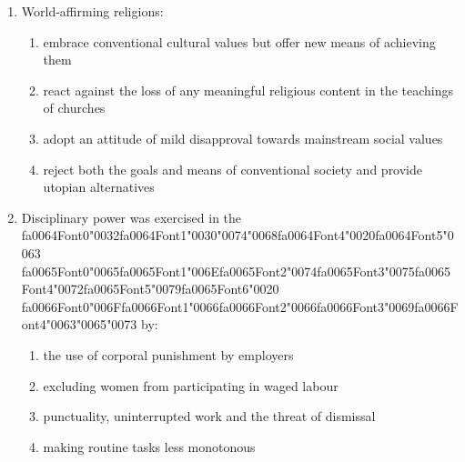 \documentclass[12pt]{article}
\begin{document}
\begin{enumerate}[label=\arabic*.]
\begin{enumerate}[label=(\alph*)]
    \item charismatic authority
    \item rational-legal authority
    \item traditional authority
    \item value-rational authority
\end{enumerate}
\item World-affirming religions:
\begin{enumerate}[label=(\alph*)]
    \item embrace conventional cultural values but offer new means of achieving them
    \item react against the loss of any meaningful religious content in the teachings of churches
    \item adopt an attitude of mild disapproval towards mainstream social values
    \item reject both the goals and means of conventional society and provide utopian alternatives
\end{enumerate}
\item Disciplinary power was exercised in the {\csname fa0064Font0\endcsname\char"0032}{\csname fa0064Font1\endcsname\char"0030}{\char"0074}{\char"0068}{\csname fa0064Font4\endcsname\char"0020}{\csname fa0064Font5\endcsname\char"0063} {\csname fa0065Font0\endcsname\char"0065}{\csname fa0065Font1\endcsname\char"006E}{\csname fa0065Font2\endcsname\char"0074}{\csname fa0065Font3\endcsname\char"0075}{\csname fa0065Font4\endcsname\char"0072}{\csname fa0065Font5\endcsname\char"0079}{\csname fa0065Font6\endcsname\char"0020} {\csname fa0066Font0\endcsname\char"006F}{\csname fa0066Font1\endcsname\char"0066}{\csname fa0066Font2\endcsname\char"0066}{\csname fa0066Font3\endcsname\char"0069}{\csname fa0066Font4\endcsname\char"0063}{\char"0065}{\char"0073} by:
\begin{enumerate}[label=(\alph*)]
    \item the use of corporal punishment by employers
    \item excluding women from participating in waged labour
    \item punctuality, uninterrupted work and the threat of dismissal
    \item making routine tasks less monotonous
\end{enumerate}

\end{enumerate}
\end{document}
